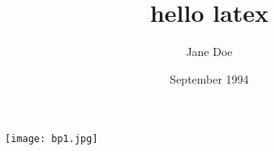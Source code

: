 \documentclass[a4paper,12pt]{article}
\title{hello latex}
\author{Jane Doe}
\date{September 1994}
\begin{document}
	\maketitle

\begin{center}
\texttt{[image: bp1.jpg]}
\end{center}
\end{document}
